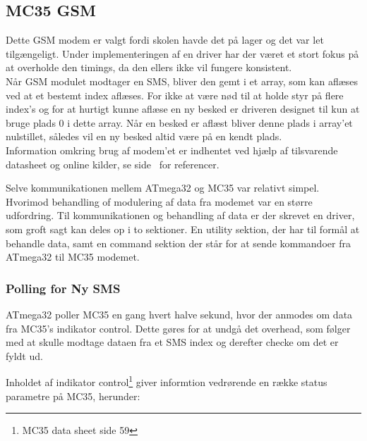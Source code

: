 \subsection{MC35 GSM}

Dette GSM modem er valgt fordi skolen havde det på lager og det var let tilgængeligt.
Under implementeringen af en driver har der været et stort fokus på at overholde den timings, da den ellers ikke vil fungere konsistent.\\

Når GSM modulet modtager en SMS, bliver den gemt i et array, som kan aflæses ved at et bestemt index aflæses. For ikke at være nød til at holde styr 
på flere index's og for at hurtigt kunne aflæse en ny besked er driveren designet til kun at bruge plads 0 i dette array. 
Når en besked er aflæst bliver denne plads i array'et nulstillet, således vil en ny besked altid være på en kendt plads.\\

Information omkring brug af modem'et er indhentet ved hjælp af tilsvarende datasheet og online kilder, se side~\pageref{sec:refs} for referencer.

Selve kommunikationen mellem ATmega32 og MC35 var relativt simpel. Hvorimod behandling of modulering af data fra modemet var en større udfordring.
Til kommunikationen og behandling af data er der skrevet en driver, som groft sagt kan deles op i to sektioner. En utility sektion, der har til formål at 
behandle data, samt en command sektion der står for at sende kommandoer fra ATmega32 til MC35 modemet. 

\subsubsection{Polling for Ny SMS}

ATmega32 poller MC35 en gang hvert halve sekund, hvor der anmodes om data fra MC35's indikator control. 
Dette gøres for at undgå det overhead, som følger med at skulle modtage dataen fra et SMS index og derefter checke om det er fyldt ud.

Inholdet af indikator control\footnote{MC35 data sheet side 59} giver informtion vedrørende en række status parametre på MC35, herunder:

